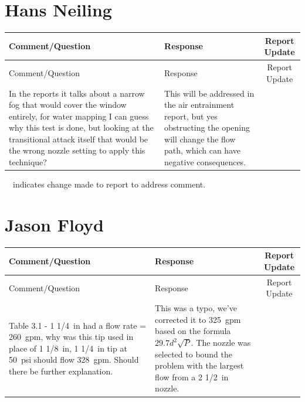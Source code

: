 \documentclass[12pt,oneside]{book}
\begin{document}
\begin{landscape}
\section{Hans Neiling}
\begin{longtable}{|L{4in}|L{3.75in}|c|}
		\hline
		Comment/Question & Response & Report Update \\ 
		\toprule[1.0pt] \endfirsthead
		\hline
		Comment/Question & Response & Report Update \\ 
		\toprule[1.0pt] \endhead
		\hline
 		In the reports it talks about a narrow fog that would cover the window entirely, for water mapping I can guess why this test is done, but looking at the transitional attack itself that would be the wrong nozzle setting to apply this technique? & 
 		This will be addressed in the air entrainment report, but yes obstructing the opening will change the flow path, which can have negative consequences.  & \\

 		\hline
\end{longtable}
\checkmark~~indicates change made to report to address comment.

\newpage

\section{Jason Floyd}
\begin{longtable}{|L{4in}|L{3.75in}|c|}

		\hline
		Comment/Question & Response & Report Update \\ 
		\toprule[1.0pt] \endfirsthead
		\hline
		Comment/Question & Response & Report Update \\ 
		\toprule[1.0pt] \endhead
		\hline
 		Table 3.1 - 1 1/4~in had a flow rate = 260~gpm, why was this tip used in place of 1 1/8~in, 1 1/4~in tip at 50~psi should flow 328~gpm. Should there be further explanation. &
 		This was a typo, we've corrected it to 325~gpm based on the formula $29.7d^2\sqrt{P}$. The nozzle was selected to bound the problem with the largest flow from a 2 1/2~in nozzle. & \\


\end{longtable}
\end{landscape}
\end{document}

